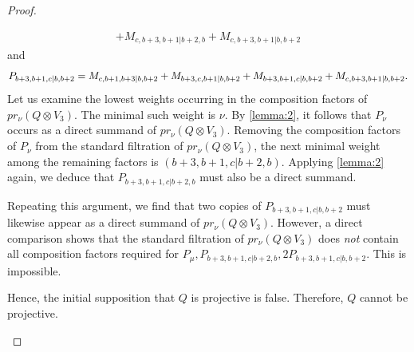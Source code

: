 \begin{proof}
\begin{enumerate}
\begin{enumerate}
\begin{equation}
\begin{aligned}
+M_{c,b+3,b+1|b+2,b}
+M_{c,b+3,b+1|b,b+2}
  \end{aligned}
\end{equation}
and 
\begin{equation}\notag
  \begin{aligned}
P_{b+3,b+1,c|b,b+2} = 
    M_{c,b+1,b+3|b,b+2}
+M_{b+3,c,b+1|b,b+2}
+M_{b+3,b+1,c|b,b+2}
+M_{c,b+3,b+1|b,b+2}.
  \end{aligned}
\end{equation}
Let us examine the lowest weights occurring in the composition factors of $pr_\nu(Q \otimes V_3)$. The minimal such weight is $\nu$. By \cref{lemma:2}, it follows that $P_\nu$ occurs as a direct summand of $pr_\nu(Q \otimes V_3)$. Removing the composition factors of $P_\nu$ from the standard filtration of $pr_\nu(Q \otimes V_3)$, the next minimal weight among the remaining factors is $(b+3,b+1,c|b+2,b)$. Applying \cref{lemma:2} again, we deduce that $P_{b+3,b+1,c|b+2,b}$ must also be a direct summand.

Repeating this argument, we find that two copies of $P_{b+3,b+1,c|b,b+2}$ must likewise appear as a direct summand of $pr_\nu(Q \otimes V_3)$.
However, a direct comparison shows that the standard filtration of $pr_\nu(Q \otimes V_3)$ does \emph{not} contain all composition factors required for $P_\mu,P_{b+3,b+1,c|b+2,b}, \allowbreak 2P_{b+3,b+1,c|b,b+2}$. This is impossible.

Hence, the initial supposition that $Q$ is projective is false. Therefore, $Q$ cannot be projective.




\end{enumerate}
\end{enumerate}
\end{proof}
